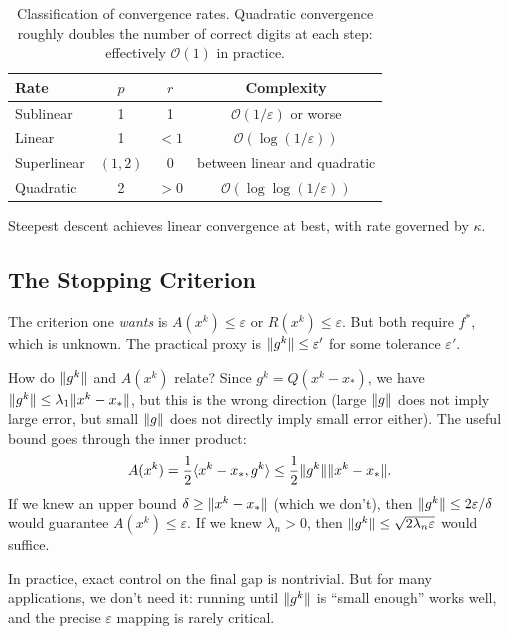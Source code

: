 \begin{table}[ht]
	\centering
	\begin{tabular}{lccc}
		\toprule
		Rate & $p$ & $r$ & Complexity \\
		\midrule
		Sublinear   & 1       & 1   & $\mathcal{O}(1/\varepsilon)$ or worse \\
		Linear      & 1       & $<1$ & $\mathcal{O}(\log(1/\varepsilon))$ \\
		Superlinear & $(1,2)$ & 0   & between linear and quadratic \\
		Quadratic   & 2       & $>0$ & $\mathcal{O}(\log\log(1/\varepsilon))$ \\
		\bottomrule
	\end{tabular}
	\caption{Classification of convergence rates.
		Quadratic convergence roughly doubles the number of correct digits at each step: effectively $\mathcal{O}(1)$ in practice.}
	\label{tab:conv-rates}
\end{table}

Steepest descent achieves linear convergence at best, with rate governed by $\kappa$.


\subsection{The Stopping Criterion}\label{sec:stopping}

The criterion one \emph{wants} is $A(x^k) \leq \varepsilon$ or $R(x^k) \leq \varepsilon$.
But both require $f^*$, which is unknown.
The practical proxy is $\lVert g^k\rVert \leq \varepsilon'$ for some tolerance $\varepsilon'$.

How do $\lVert g^k\rVert$ and $A(x^k)$ relate?
Since $g^k = Q(x^k - x_*)$, we have $\lVert g^k\rVert \leq \lambda_1 \lVert x^k - x_*\rVert$, but this is the wrong direction (large $\lVert g\rVert$ does not imply large error, but small $\lVert g\rVert$ does not directly imply small error either).
The useful bound goes through the inner product:
\begin{equation}\label{eq:gap-gradient-bound}
	A(x^k) = \frac{1}{2} \langle x^k - x_*, g^k\rangle \leq \frac{1}{2} \lVert g^k\rVert \lVert x^k - x_*\rVert.
\end{equation}
If we knew an upper bound $\delta \geq \lVert x^k - x_*\rVert$ (which we don't), then $\lVert g^k\rVert \leq 2\varepsilon/\delta$ would guarantee $A(x^k) \leq \varepsilon$.
If we knew $\lambda_n > 0$, then $\lVert g^k\rVert \leq \sqrt{2\lambda_n \varepsilon}$ would suffice.

In practice, exact control on the final gap is nontrivial.
But for many applications, we don't need it: running until $\lVert g^k\rVert$ is ``small enough'' works well, and the precise $\varepsilon$ mapping is rarely critical.


